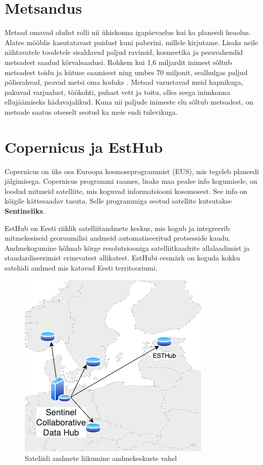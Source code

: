 \section{Metsandus}
Metsad omavad olulist rolli nii ühiskonna igapäevaelus kui ka planeedi heaolus.
Alates mööblis kasutatavast puidust kuni paberini, millele kirjutame. Lisaks neile
nähtavatele toodetele sisaldavad paljud ravimid, kosmeetika ja pesuvahendid
metsadest saadud kõrvalsaadusi. Rohkem kui 1,6 miljardit inimest sõltub
metsadest toidu ja kütuse saamisest ning umbes 70 miljonit, sealhulgas paljud
põlisrahvad, peavad metsi oma koduks \cite{karsentyUnderlyingCausesRapid2003}. 
Metsad varustavad meid hapnikuga, pakuvad
varjualust, töökohti, puhast vett ja toitu, olles seega inimkonna ellujäämiseks
hädavajalikud. Kuna nii paljude inimeste elu sõltub metsadest, on metsade saatus
otseselt seotud ka meie endi tulevikuga. \cite{WWFImportanceForests} 

\section{Copernicus ja EstHub}
Copernicus on üks osa Euroopa kosmoseprogrammist (EUS), mis tegeleb planeedi jälgimisega. Copernicus programmi raames, lisaks maa pealse info kogumisele, on loodud mitmeid satelliite, mis koguvad informatsiooni kosomosest. See info on kõigile kättesaadav tasuta. Selle programmiga seotud satellite kutsutakse \textbf{Sentineliks}. \cite{CopernicusCopernicus}


EstHub on Eesti riiklik satelliitandmete keskus, mis kogub ja integreerib
mitmekesiseid georuumilisi andmeid automatiseeritud protsesside kaudu.
Andmekogumine hõlmab kõrge resolutsiooniga satelliitkaadrite allalaadimist ja
standardiseerimist erinevatest allikatest. EstHubi eesmärk on koguda kokku sateliidi andmed mis katavad Eesti territooriumi. \cite{maa-ametNationalSatelliteData}

\begin{figure}[H]
    \centering
    \includegraphics[width=.3\textwidth]{figures/datahubEU.drawio.png}
    \caption{Sateliidi andmete liikumine andmekeskuste vahel}
    \label{fig:esthubliiklus}
\end{figure}


